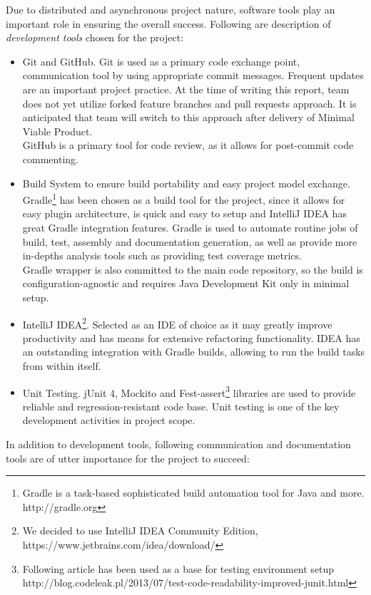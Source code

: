 Due to distributed and asynchronous project nature, software tools play an important role in ensuring the overall success. Following are description of \emph{development tools} chosen for the project:

\begin{itemize}
	\item Git and GitHub. Git is used as a primary code exchange point, communication tool by using appropriate commit messages. Frequent updates are an
	important project practice. At the time of writing this report, team does not yet utilize forked feature branches and pull requests approach. It is anticipated that team will
	switch to this approach after delivery of Minimal Viable Product. \\GitHub is a primary tool for code review, as it allows for post-commit code commenting.
	\item Build System to ensure build portability and easy project model exchange.
	 Gradle\footnote{Gradle is a task-based sophisticated build automation tool for Java and more. http://gradle.org} has been chosen as a build tool for the project, since it allows for easy plugin architecture, is quick and easy to setup and IntelliJ IDEA has
	 great Gradle integration features. Gradle is used to automate routine jobs of build, test, assembly  and documentation generation,
	as well as provide more in-depths analysis tools such as providing test coverage metrics.\\Gradle wrapper is also committed to the main code repository, so the build
	is configuration-agnostic and requires Java Development Kit only in minimal setup.
	\item IntelliJ IDEA\footnote{We decided to use IntelliJ IDEA Community Edition, https://www.jetbrains.com/idea/download/}. Selected as an IDE of choice as it may greatly improve productivity and has means for extensive refactoring functionality. IDEA has an outstanding
	integration with Gradle builds, allowing to run the build tasks from within itself.
	\item Unit Testing. jUnit 4, Mockito and Fest-assert\footnote{Following article has been used as a base for testing environment setup http://blog.codeleak.pl/2013/07/test-code-readability-improved-junit.html} libraries are used to provide reliable and regression-resistant code base. Unit testing is one of the key development
	activities in project scope.
\end{itemize}

In addition to development tools, following communication and documentation tools are of utter importance for the project to succeed:

